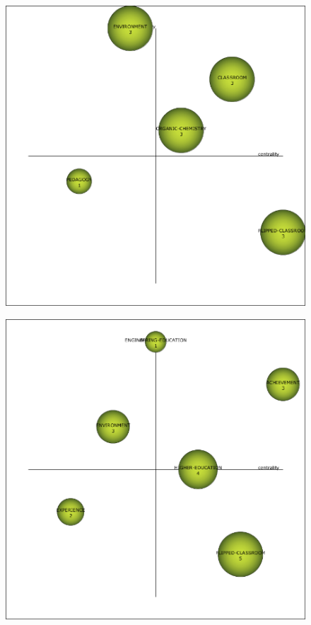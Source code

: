\documentclass{textolivre}
\begin{document}
\begin{figure}[htbp]
 \begin{minipage}{.45\textwidth}
 \includegraphics[width=\textwidth]{Fig04a.png}
 \label{fig04a}
 \end{minipage}
 \hfill
 \begin{minipage}{.45\textwidth}
 \includegraphics[width=\textwidth]{Fig04b.png}

\end{minipage}
\end{figure}
\end{document}
